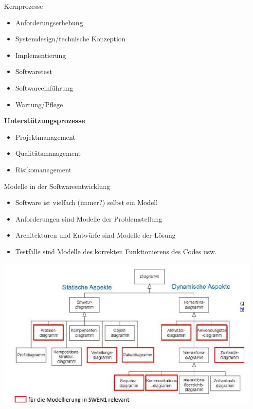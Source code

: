 \begin{corollary}{Kernprozesse}

\begin{minipage}[t]{0.6\textwidth}
\begin{itemize}
  \item Anforderungserhebung
  \item Systemdesign/technische Konzeption
  \item Implementierung
  \item Softwaretest
  \item Softwareeinführung
  \item Wartung/Pflege
\end{itemize}
\end{minipage}
\begin{minipage}[t]{0.38\textwidth}
\textbf{\textcolor{frog}{Unterstützungsprozesse}}
\begin{itemize}
  \item Projektmanagement
  \item Qualitätsmanagement
  \item Risikomanagement
\end{itemize}
\end{minipage}
\end{corollary}



\begin{concept}{Modelle in der Softwareentwicklung}
\begin{itemize}
  \item Software ist vielfach (immer?) selbst ein Modell
  \item Anforderungen sind Modelle der Problemstellung
  \item Architekturen und Entwürfe sind Modelle der Lösung
  \item Testfälle sind Modelle des korrekten Funktionierens des Codes usw.
\end{itemize}
\includegraphics[width=\linewidth]{images/2024_12_29_0d1d7b5551ea1b4b41bdg-01(1)}
\end{concept}



